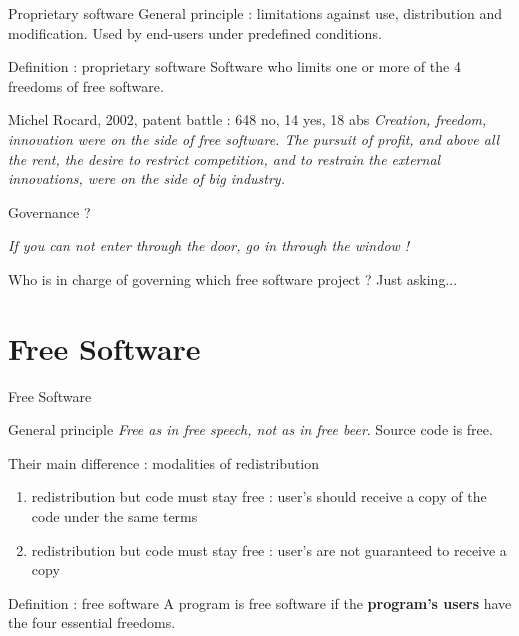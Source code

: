 \documentclass{beamer}
\begin{document}
\begin{frame}{Proprietary software}
  General principle : limitations against use, distribution and modification. Used by end-users under predefined conditions.

  \begin{alertblock}{Definition : proprietary software}
    Software who limits one or more of the 4 freedoms of free software.    
  \end{alertblock}

\pause

  \begin{block}{Michel Rocard, 2002, patent battle : 648 no, 14 yes, 18 abs}
   \textit{Creation, freedom, innovation were on the side of free software. The pursuit of profit, and above all the rent, the desire to restrict competition, and to restrain the external innovations, were on the side of big industry.}
  \end{block}
\end{frame}

\begin{frame}{Governance ?}
  
\textit{If you can not enter through the door, go in through the window !}

Who is in charge of governing which free software project ? Just asking...

\end{frame}


\section{Free Software}


\begin{frame}{Free Software}

  \begin{alertblock}{General principle}
    \textit{Free as in free speech, not as in free beer}. Source code is free.
  \end{alertblock}
  Their main difference : modalities of redistribution
  \begin{enumerate}
  \item redistribution but code must stay free : user's should receive a copy of the code under the same terms
  \item redistribution but code must stay free : user's are not guaranteed to receive a copy
  \end{enumerate}

  \begin{alertblock}{Definition : free software}
   A program is free software if the \textbf{program's users} have the four essential freedoms.
  \end{alertblock}
  
\end{frame}
\end{document}
